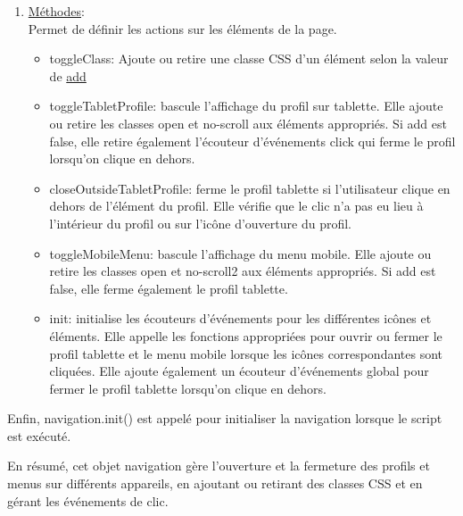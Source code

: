 \documentclass[a4paper,11pt]{article}
\begin{document}
\begin{enumerate}
\begin{enumerate}
                        \item \underline{Méthodes}: \\
                            Permet de définir les actions sur les éléments de la page.
                            \begin{itemize}
                                \item toggleClass:  Ajoute ou retire une classe CSS d'un élément selon la valeur de \underline{add}
                                \item toggleTabletProfile:  bascule l'affichage du profil sur tablette. Elle ajoute ou retire les classes 
                                open et no-scroll aux éléments appropriés. Si add est false, elle retire également l'écouteur d'événements click qui ferme le profil lorsqu'on clique en dehors.
                                \item closeOutsideTabletProfile: ferme le profil tablette si l'utilisateur clique en dehors de l'élément du profil. Elle vérifie que le clic n'a pas eu lieu à l'intérieur du profil ou 
                                sur l'icône d'ouverture du profil.
                                \item toggleMobileMenu: bascule l'affichage du menu mobile. Elle ajoute ou retire les classes open et no-scroll2 aux éléments appropriés. Si add est false, elle ferme également le profil tablette.
                                \item init: initialise les écouteurs d'événements pour les différentes icônes et éléments. Elle appelle les fonctions appropriées pour ouvrir ou fermer le profil tablette et le menu mobile lorsque les icônes correspondantes sont cliquées. Elle ajoute également un écouteur d'événements global pour fermer le profil tablette lorsqu'on clique en dehors.
                            \end{itemize}
                    \end{enumerate}

                    \noindent Enfin, navigation.init() est appelé pour initialiser la navigation lorsque le script est exécuté.
                
                    \begin{tcolorbox}[colback=lightgray!6, colframe=black, left=5mm, right=5mm, top=2mm, bottom=2mm, boxrule=0.1mm]
                        En résumé, cet objet navigation gère l'ouverture et la fermeture des profils et menus sur différents appareils, en ajoutant ou retirant des classes CSS et en gérant les événements de clic.
                    \end{tcolorbox}


\end{enumerate}
\end{document}
